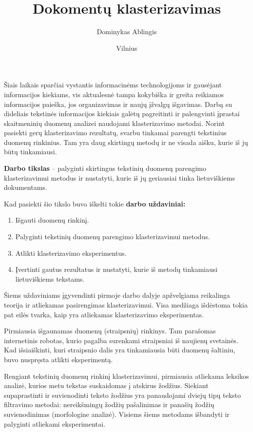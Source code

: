 \documentclass{VUMIFInfBakalaurinis}
\title{Dokomentų klasterizavimas}
\author{Dominykas Ablingis}
\date{Vilnius \\ \the\year}
\begin{document}
\maketitle
\tableofcontents


Šiais laikais sparčiai vystantis informacinėms technologijoms ir
gausėjant informacijos kiekiams, vis aktualesnė tampa kokybiška ir
greita reikiamos informacijos paieška, jos organizavimas ir naujų
įžvalgų išgavimas. Darbą su dideliais tekstinės informacijos kiekiais
galėtų pagreitinti ir palengvinti įprastai skaitmeninių duomenų analizei
naudojami klasterizavimo metodai. Norint pasiekti gerų klasterizavimo
rezultatų, svarbu tinkamai parengti tekstinius duomenų rinkinius. Tam
yra daug skirtingų metodų ir ne visada aišku, kurie iš jų būtų
tinkamiausi.

\textbf{Darbo tikslas} -- palyginti skirtingus tekstinių duomenų
parengimo klasterizavimui metodus ir nustatyti, kurie iš jų geriausiai
tinka lietuviškiems dokumentams.

Kad pasiekti šio tikslo buvo iškelti tokie \textbf{darbo uždaviniai:}

\begin{enumerate}
\def\labelenumi{\arabic{enumi}.}
\item
  Išgauti duomenų rinkinį.
\item
  Palyginti tekstinių duomenų parengimo klasterizavimui metodus.
\item
  Atlikti klasterizavimo eksperimentus.
\item
  Įvertinti gautus rezultatus ir nustatyti, kurie iš metodų tinkamiausi
  lietuviškiems tekstams.
\end{enumerate}

Šiems uždaviniams įgyvendinti pirmoje darbo dalyje apžvelgiama
reikalinga teorija ir atliekamas pasirengimas klasterizavimui. Visa
medžiaga išdėstoma tokia pat eilės tvarka, kaip yra atliekamas
klasterizavimo eksperimentas.

Pirmiausia išgaunamas duomenų (straipsnių) rinkinys. Tam parašomas
  internetinis robotas, kurio pagalba surenkami straipsniai iš naujienų
  svetainės. Kad išsiaiškinti, kuri straipsnio dalis yra tinkamiausia
  būti duomenų šaltiniu, buvo nuspręsta atlikti eksperimentą.

Rengiant tekstinių duomenų rinkinį klasterizavimui, pirmiausia
  atliekama leksikos analizė, kurios metu tekstas suskaidomas į atskirus
  žodžius. Siekiant supaprastinti ir suvienodinti teksto žodžius yra
  panaudojami dviejų tipų teksto filtravimo metodai: nereikšmingų žodžių
  pašalinimas ir panašių žodžių suvienodinimas (morfologine analizė).
  Visiems šiems metodams išbandyti ir palyginti atliekami eksperimentai.
\end{document}
